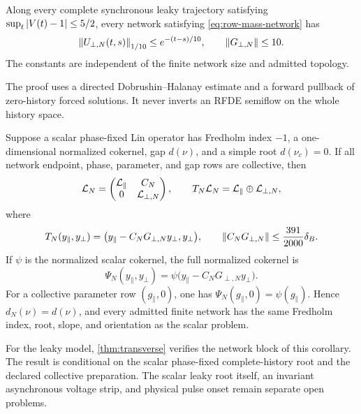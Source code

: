 \begin{theorem}\label{thm:transverse}
Along every complete synchronous leaky trajectory satisfying
\(\sup_t\left\lvert V(t)-1\right\rvert\le5/2\), every network satisfying
\cref{eq:row-mass-network} has
\begin{equation}
 \left\lVert U_{\perp,N}(t,s)\right\rVert_{1/10}\le e^{-(t-s)/10},
 \qquad \left\lVert G_{\perp,N}\right\rVert\le10.                       \label{eq:green-bound}
\end{equation}
The constants are independent of the finite network size and admitted
topology.
\end{theorem}

The proof uses a directed Dobrushin--Halanay estimate and a forward pullback
of zero-history forced solutions.  It never inverts an RFDE semiflow on the
whole history space.

\begin{corollary}
\label{cor:canonical-transfer}
Suppose a scalar phase-fixed Lin operator has Fredholm index \(-1\), a
one-dimensional normalized cokernel, gap \(d(\nu)\), and a simple root
\(d(\nu_c)=0\).  If all network endpoint, phase, parameter, and gap rows are
collective, then
\begin{equation}
 \mathcal L_N=
 \begin{pmatrix}\mathcal L_{\parallel}&C_N\\0&\mathcal L_{\perp,N}\end{pmatrix},
 \qquad
 T_N\mathcal L_N=\mathcal L_{\parallel}\oplus\mathcal L_{\perp,N},           \label{eq:lin-sum}
\end{equation}
where
\[
 T_N(y_\parallel,y_\perp)
 =\bigl(y_\parallel-C_NG_{\perp,N}y_\perp,y_\perp\bigr),
 \qquad
 \left\lVert C_NG_{\perp,N}\right\rVert\le\frac{391}{2000}\delta_B.
\]
If \(\psi\) is the normalized scalar cokernel, the full normalized
cokernel is
\begin{equation}
 \Psi_N(y_\parallel,y_\perp)
 =\psi\bigl(y_\parallel-C_NG_{\perp,N}y_\perp\bigr).    \label{eq:full-cokernel}
\end{equation}
For a collective parameter row \((g_\parallel,0)\), one has
\(\Psi_N(g_\parallel,0)=\psi(g_\parallel)\).  Hence
\(d_N(\nu)=d(\nu)\), and every admitted finite network has the same
Fredholm index, root, slope, and orientation as the scalar problem.
\end{corollary}

For the leaky model, \cref{thm:transverse} verifies the network block of
this corollary.  The result is conditional on the scalar phase-fixed
complete-history root and the declared collective preparation.  The scalar
leaky root itself, an invariant asynchronous voltage strip, and physical
pulse onset remain separate open problems.

